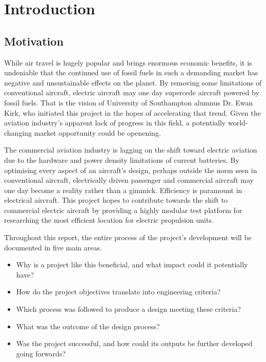 \documentclass[../../main.tex]{subfiles}
\begin{document}
\chapter{Introduction} \label{chapter:introduction}

\section{Motivation} \label{sec:introduction:motivation}

While air travel is hugely popular and brings enormous economic benefits, it is undeniable that the continued use of fossil fuels in such a demanding market has negative and unsustainable effects on the planet.
By removing some limitations of conventional aircraft, electric aircraft may one day supercede aircraft powered by fossil fuels.
That is the vision of University of Southampton alumnus Dr. Ewan Kirk, who initiated this project in the hopes of accelerating that trend.
Given the aviation industry's apparent lack of progress in this field, a potentially world-changing market opportunity could be openening.

The commercial aviation industry is lagging on the shift toward electric aviation due to the hardware and power density limitations of current batteries.
By optimising every aspect of an aircraft's design, perhaps outside the norm seen in conventional aircraft, electrically driven passenger and commercial aircraft may one day become a reality rather than a gimmick.
Efficiency is paramount in electrical aircraft.
This project hopes to contribute towards the shift to commercial electric aircraft by providing a highly modular test platform for researching the most efficient location for electric propulsion units. 

Throughout this report, the entire process of the project's development will be documented in five main areas.

\begin{itemize}
    \item Why is a project like this beneficial, and what impact could it potentially have?
    \item How do the project objectives translate into engineering criteria?
    \item Which process was followed to produce a design meeting these criteria?
    \item What was the outcome of the design process?
    \item Was the project successful, and how could its outputs be further developed going forwards?
\end{itemize}
\end{document}
